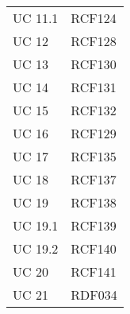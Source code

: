 \begin{longtabu} {X[c] X[c]}
   {UC 11.1} & RCF124 \\
   
   {UC 12} & RCF128 \\
   
   {UC 13} & RCF130 \\
   
   {UC 14} & RCF131 \\
   
   {UC 15} & RCF132 \\
   
   {UC 16} & RCF129 \\
   
   {UC 17} & RCF135 \\
   
   {UC 18} & RCF137 \\
   
   {UC 19} & RCF138 \\
   
   {UC 19.1} & RCF139 \\
   
   {UC 19.2} & RCF140 \\
   
    {UC 20} & RCF141 \\
    
    {UC 21} & RDF034 \\
                                
    
    \end{longtabu}
    
    
    
    
    
    
    
    
    
    
    
   